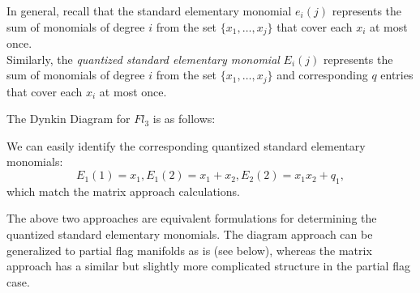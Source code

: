 \documentclass[11pt]{article}
\begin{document}
In general, recall that the standard elementary monomial $e_i(j)$ represents the sum of monomials of degree $i$ from the set $\{x_1, \dots, x_j\}$ that cover each $x_i$ at most once. \\

Similarly, the \textit{quantized standard elementary monomial} $E_i(j)$ represents the sum of monomials of degree $i$ from the set $\{x_1, \dots, x_j\}$ and corresponding $q$ entries that cover each $x_i$ at most once. \\

\begin{eg}
The Dynkin Diagram for $Fl_3$ is as follows:
\begin{center}
\end{center}
We can easily identify the corresponding quantized standard elementary monomials:
\[
    \boxed{E_1(1) = x_1, E_1(2) = x_1 + x_2, E_2(2) = x_1x_2 + q_1},
\]
which match the matrix approach calculations.
\end{eg}


\begin{remark}
The above two approaches are equivalent formulations for determining the quantized standard elementary monomials. The diagram approach can be generalized to partial flag manifolds as is (see below), whereas the matrix approach has a similar but slightly more complicated structure in the partial flag case.
\end{remark}
\end{document}
